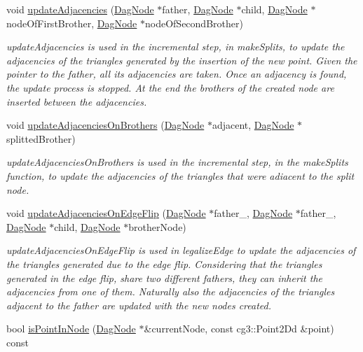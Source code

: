 \begin{DoxyCompactItemize}
void \hyperlink{classDelauneyTriangulation_a233cf2b99c52e470d76efbaaac67941d}{update\+Adjacencies} (\hyperlink{classDagNode}{Dag\+Node} $\ast$father, \hyperlink{classDagNode}{Dag\+Node} $\ast$child, \hyperlink{classDagNode}{Dag\+Node} $\ast$node\+Of\+First\+Brother, \hyperlink{classDagNode}{Dag\+Node} $\ast$node\+Of\+Second\+Brother)
\begin{DoxyCompactList}\small\item\em update\+Adjacencies is used in the incremental step, in make\+Splits, to update the adjacencies of the triangles generated by the insertion of the new point. Given the pointer to the father, all its adjacencies are taken. Once an adjacency is found, the update process is stopped. At the end the brothers of the created node are inserted between the adjacencies. \end{DoxyCompactList}\item 
void \hyperlink{classDelauneyTriangulation_a0a934c13404702669c8e0ea84991c723}{update\+Adjacencies\+On\+Brothers} (\hyperlink{classDagNode}{Dag\+Node} $\ast$adjacent, \hyperlink{classDagNode}{Dag\+Node} $\ast$splitted\+Brother)
\begin{DoxyCompactList}\small\item\em update\+Adjacencies\+On\+Brothers is used in the incremental step, in the make\+Splits function, to update the adjacencies of the triangles that were adiacent to the split node. \end{DoxyCompactList}\item 
void \hyperlink{classDelauneyTriangulation_a249847fa5ada852c28381384474a397c}{update\+Adjacencies\+On\+Edge\+Flip} (\hyperlink{classDagNode}{Dag\+Node} $\ast$father\+\_, \hyperlink{classDagNode}{Dag\+Node} $\ast$father\+\_, \hyperlink{classDagNode}{Dag\+Node} $\ast$child, \hyperlink{classDagNode}{Dag\+Node} $\ast$brother\+Node)
\begin{DoxyCompactList}\small\item\em update\+Adjacencies\+On\+Edge\+Flip is used in legalize\+Edge to update the adjacencies of the triangles generated due to the edge flip. Considering that the triangles generated in the edge flip, share two different fathers, they can inherit the adjacencies from one of them. Naturally also the adjacencies of the triangles adjacent to the father are updated with the new nodes created. \end{DoxyCompactList}\item 
bool \hyperlink{classDelauneyTriangulation_ada3abfc19b784c0a59ad543719013060}{is\+Point\+In\+Node} (\hyperlink{classDagNode}{Dag\+Node} $\ast$\&current\+Node, const cg3\+::\+Point2\+Dd \&point) const

\end{DoxyCompactItemize}
